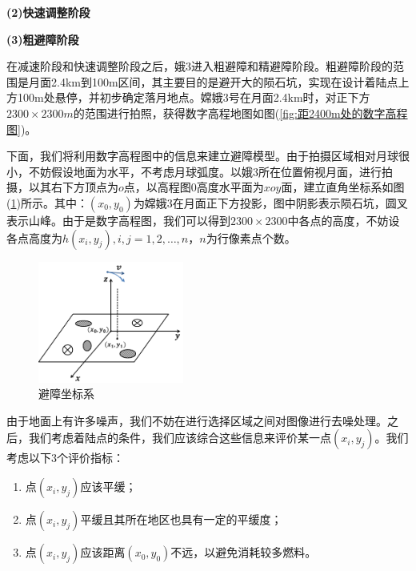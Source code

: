             \par
            \textbf{(2)快速调整阶段}
            \par
            \par
            \textbf{(3)粗避障阶段}
            \par
            在减速阶段和快速调整阶段之后，娥3进入粗避障和精避障阶段。粗避障阶段的范围是月面2.4km到100m区间，其主要目的是避开大的陨石坑，实现在设计着陆点上方100m处悬停，并初步确定落月地点。嫦娥3号在月面2.4km时，对正下方$2300\times 2300m$的范围进行拍照，获得数字高程地图如图(\ref{fig:距2400m处的数字高程图})。
            \par
            下面，我们将利用数字高程图中的信息来建立避障模型。由于拍摄区域相对月球很小，不妨假设地面为水平，不考虑月球弧度。以娥3所在位置俯视月面，进行拍摄，以其右下方顶点为$o$点，以高程图$0$高度水平面为$xoy$面，建立直角坐标系如图(\ref{fig:避障坐标系})所示。其中：$(x_0,y_0)$为嫦娥3在月面正下方投影，图中阴影表示陨石坑，圆叉表示山峰。由于是数字高程图，我们可以得到$2300\times 2300$中各点的高度，不妨设各点高度为$h(x_i,y_j),i,j=1,2,\dots,n$，$n$为行像素点个数。
            \begin{figure}[H]
            \centering
            \includegraphics[height=4cm]{images/Obstacle_avoidance_coordinate_system.jpg}
            \caption{避障坐标系}
            \label{fig:避障坐标系}
            \end{figure}
            \par
            由于地面上有许多噪声，我们不妨在进行选择区域之间对图像进行去噪处理。之后，我们考虑着陆点的条件，我们应该综合这些信息来评价某一点$(x_i,y_j)$。我们考虑以下3个评价指标：
            \begin{enumerate}
            \item 点$(x_i,y_j)$应该平缓；
            \item 点$(x_i,y_j)$平缓且其所在地区也具有一定的平缓度；
            \item 点$(x_i,y_j)$应该距离$(x_0,y_0)$不远，以避免消耗较多燃料。
            \end{enumerate}
            \par
